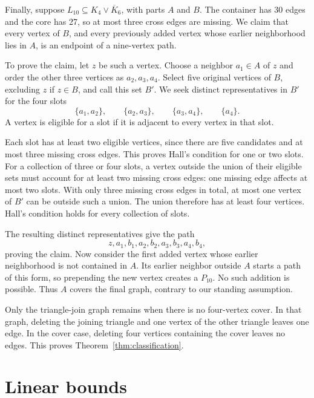 \documentclass[12pt]{article}
\newcommand{\Ic}{\overline K}
\begin{document}
Finally, suppose $L_{10}\subseteq K_4\vee\Ic_6$, with parts
$A$ and $B$. The container has 30 edges and the core has 27,
so at most three cross edges are missing.
We claim that every vertex of $B$, and every previously added
vertex whose earlier neighborhood lies in $A$, is an endpoint
of a nine-vertex path.

To prove the claim, let $z$ be such a vertex. Choose a neighbor
$a_1\in A$ of $z$ and order the other three vertices as
$a_2,a_3,a_4$. Select five original vertices of $B$,
excluding $z$ if $z\in B$, and call this set $B'$.
We seek distinct representatives in $B'$ for the four slots
\[
 \{a_1,a_2\},\qquad \{a_2,a_3\},\qquad
 \{a_3,a_4\},\qquad \{a_4\}.
\]
A vertex is eligible for a slot if it is adjacent to every
vertex in that slot.

Each slot has at least two eligible vertices, since there
are five candidates and at most three missing cross edges.
This proves Hall's condition for one or two slots.
For a collection of three or four slots, a vertex outside
the union of their eligible sets must account for at least
two missing cross edges: one missing edge affects at most
two slots. With only three missing cross edges in total,
at most one vertex of $B'$ can be outside such a union.
The union therefore has at least four vertices.
Hall's condition holds for every collection of slots.

The resulting distinct representatives give the path
\[
 z,a_1,b_1,a_2,b_2,a_3,b_3,a_4,b_4,
\]
proving the claim. Now consider the first added vertex whose
earlier neighborhood is not contained in $A$. Its earlier
neighbor outside $A$ starts a path of this form, so
prepending the new vertex creates a $P_{10}$.
No such addition is possible. Thus $A$ covers the final
graph, contrary to our standing assumption.

Only the triangle-join graph remains when there is no
four-vertex cover. In that graph, deleting the joining
triangle and one vertex of the other triangle leaves one
edge. In the cover case, deleting four vertices containing
the cover leaves no edges. This proves
Theorem~\ref{thm:classification}.

\section{Linear bounds}\label{sec:linear}
\end{document}
